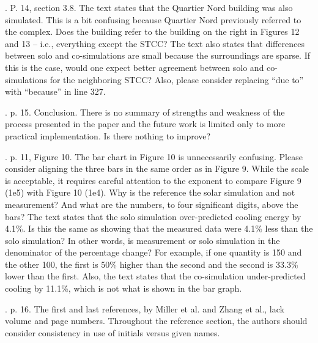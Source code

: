 \documentclass[answers,12pt]{exam}
\begin{document}
\begin{questions}
. P. 14, section 3.8.  The text states that the Quartier Nord building was also simulated. This is a bit confusing because Quartier Nord previously referred to the complex.  Does the building refer to the building on the right in Figures 12 and 13 – i.e., everything except the STCC?  The text also states that differences between solo and co-simulations are small because the surroundings are sparse.  If this is the case, would one expect better agreement between solo and co-simulations for the neighboring STCC?  Also, please consider replacing “due to” with “because” in line 327. 
\begin{solution}
\end{solution}

. p. 15.  Conclusion.  There is no summary of strengths and weakness of the process presented in the paper and the future work is limited only to more practical implementation.  Is there nothing to improve? 
\begin{solution}
\end{solution}

. p. 11, Figure 10. The bar chart in Figure 10 is unnecessarily confusing.  Please consider aligning the three bars in the same order as in Figure 9.  While the scale is acceptable, it requires careful attention to the exponent to compare Figure 9 (1e5) with Figure 10 (1e4).   Why is the reference the solar simulation and not measurement?  And what are the numbers, to four significant digits, above the bars?  The text states that the solo simulation over-predicted cooling energy by 4.1\%.  Is this the same as showing that the measured data were 4.1\% less than the solo simulation?  In other words, is measurement or solo simulation in the denominator of the percentage change?  For example, if one quantity is 150 and the other 100, the first is 50\% higher than the second and the second is 33.3\% lower than the first.  Also, the text states that the co-simulation under-predicted cooling by 11.1\%, which is not what is shown in the bar graph.
\begin{solution}
\end{solution}

. p. 16. The first and last references, by Miller et al. and Zhang et al., lack volume and page numbers.  Throughout the reference section, the authors should consider consistency in use of initials versus given names.   
\begin{solution}
\end{solution}


\end{questions}
\end{document}
